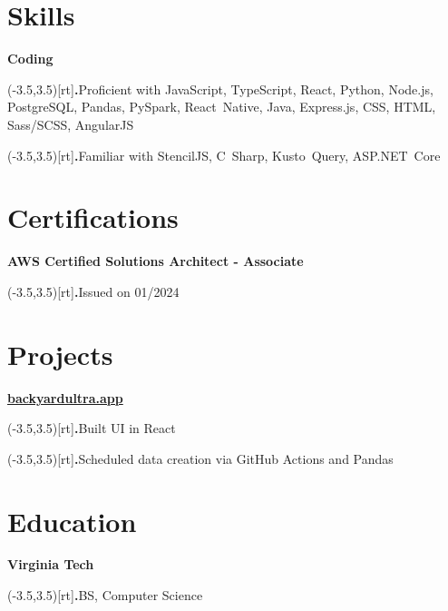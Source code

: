 \documentclass[10pt]{extarticle}
\newcommand{\BulletMark}{{\color{bulletMark}\large\bfseries.}}
\newcommand{\SideBox}[1]{\makebox(-3.5,3.5)[rt]{#1}}
\newcommand{\Bullet}[1]{\item\SideBox{\BulletMark}{\color{bullet}#1}}
\newcommand{\Bullets}[1]{\begin{trivlist}#1\end{trivlist}}
\newcommand{\Subtitle}[1]{{\color{subtitle}\bfseries#1}}
\newcommand{\Subsection}[2]{\Subtitle{#1}\Bullets{#2}}
\newcommand{\Website}[1]{{\href{https://#1}{#1}}}
\begin{document}
\begin{paracol}{2}
\begin{rightcolumn}
    \section{Skills}
      \Subsection{Coding}{
        \Bullet{Proficient with JavaScript, TypeScript, React, Python, Node.js, PostgreSQL, Pandas, PySpark, React~Native, Java, Express.js, CSS, HTML, Sass/SCSS, AngularJS}
        \Bullet{Familiar with StencilJS, C~Sharp, Kusto~Query, ASP.NET~Core}
      }
    \vfill
      \section{Certifications}
        \Subsection{AWS Certified Solutions Architect - Associate}{
          \Bullet{Issued on 01/2024}
        }
    \vfill
      \section{Projects}
        \Subsection{\Website{backyardultra.app}}{
          \Bullet{Built UI in React}
          \Bullet{Scheduled data creation via GitHub Actions and Pandas}
        }
    \vfill
    \section{Education}
      \Subsection{Virginia Tech}{
        \Bullet{BS, Computer Science}
      }
    \pagebreak
  \end{rightcolumn}
\end{paracol}
\end{document}

